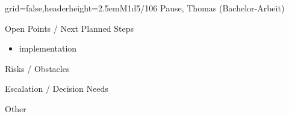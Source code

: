 \documentclass[english]{kiesgrube}
\begin{document}
\begin{poster}{grid=false,headerheight=2.5em}{}{M1d5/106 Pause, Thomas (Bachelor-Arbeit)}{}{}
\begin{posterbox}[name=open,column=1,below=description]{Open Points / Next Planned Steps}
\begin{itemize}
\item implementation
\end{itemize}
\end{posterbox}
\begin{posterbox}[name=risks,column=1,below=open]{Risks / Obstacles}
\end{posterbox}
\begin{posterbox}[name=escalation,column=1,below=risks]{Escalation / Decision Needs}
\end{posterbox}
\begin{posterbox}[name=other,column=1,below=escalation]{Other}
\end{posterbox}
\footer{}
\end{poster}

\newpage
\end{document}
